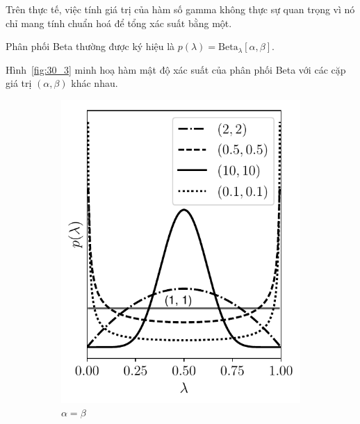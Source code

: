 {Trên thực tế, việc tính giá trị của hàm số gamma không thực sự
quan trọng vì nó chỉ mang tính chuẩn hoá để tổng xác suất bằng một.}

Phân phối Beta thường được ký hiệu là $p(\lambda) =  \text{Beta}_{\lambda}[\alpha, \beta]$.

Hình~\ref{fig:30_3} minh hoạ hàm mật độ xác suất của phân phối Beta với các
cặp giá trị $(\alpha, \beta)$ khác nhau.

\begin{figure}[t]
    \begin{subfigure}{0.325\textwidth}
    \includegraphics[width=0.99\linewidth]{Chapters/02_LinearAlgebra/30_prob/python/beta1.pdf}
    \caption{$\alpha = \beta$}
    \label{fig:30_3a}
    \end{subfigure}
    \begin{subfigure}{0.325\textwidth}

\end{subfigure}
\end{figure}
